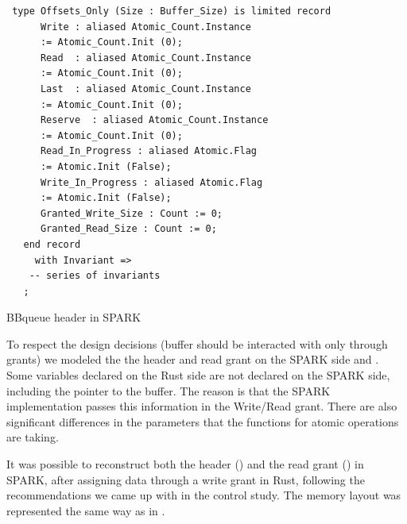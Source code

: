 \documentclass[nomenclature, english, bibtex]{kththesis}
\begin{document}
\begin{listing}[!ht]
\begin{verbatim}
 type Offsets_Only (Size : Buffer_Size) is limited record
      Write : aliased Atomic_Count.Instance 
      := Atomic_Count.Init (0);
      Read  : aliased Atomic_Count.Instance 
      := Atomic_Count.Init (0);
      Last  : aliased Atomic_Count.Instance 
      := Atomic_Count.Init (0);
      Reserve  : aliased Atomic_Count.Instance 
      := Atomic_Count.Init (0);
      Read_In_Progress : aliased Atomic.Flag 
      := Atomic.Init (False);
      Write_In_Progress : aliased Atomic.Flag 
      := Atomic.Init (False);
      Granted_Write_Size : Count := 0;
      Granted_Read_Size : Count := 0;
   end record
     with Invariant =>
    -- series of invariants
   ;
\end{verbatim}
\caption[BBqueue header in SPARK]{BBqueue header in SPARK}
\label{lst:SPARK_bbqueue_header}
\end{listing}
\FloatBarrier

To respect the design decisions (buffer should be interacted with only through grants) we modeled the the header and read grant on the SPARK side  and . Some variables declared on the Rust side are not declared on the SPARK side, including the pointer to the buffer. The reason is that the SPARK implementation passes this information in the Write/Read grant. There are also significant differences in the parameters that the functions for atomic operations are taking.

It was possible to reconstruct both the header () and the read grant () in SPARK, after assigning data through a write grant in Rust, following the recommendations we came up with in the control study. The memory layout was represented the same way as in .
\end{document}
